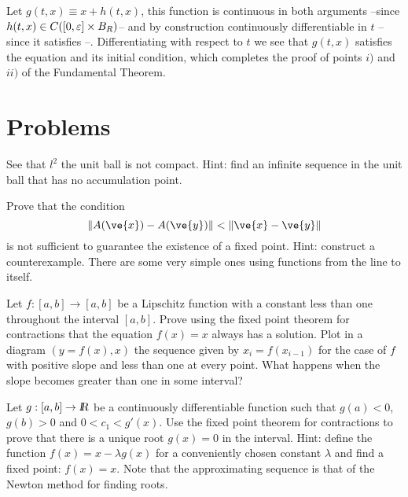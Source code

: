 \espa
Let $g(t,x)\equiv x+h(t,x)$, this function is continuous in both
arguments --since $h(t,x)\in C([0,\mbox{$\varepsilon$}]\times B_R)$-- and by
construction continuously
differentiable in $t$ --since it satisfies --.
Differentiating  with respect to $t$ we see that $g(t,x)$
satisfies the equation  and its initial condition, which
completes the proof of points $i)$ and $ii)$ of the Fundamental Theorem.
\epru


\section{Problems}



\bpro
See that $l^2$ the unit ball is not compact. 
Hint: find an infinite sequence in the unit ball that has no accumulation point.
\epro

\bpro
Prove that the condition 
\begin{equation}
  \|A(\ve{x}) - A(\ve{y})\| < \|\ve{x} - \ve{y}\|
\end{equation}
is not sufficient to guarantee the existence of a fixed point.
Hint: construct a counterexample. 
There are some very simple ones using functions from the line to itself.
\epro

\bpro 
Let $f:[a,b] \to [a,b]$ be a Lipschitz function with a constant less
than one throughout the interval $[a,b]$. Prove using the fixed point theorem
for contractions that the equation $f(x) = x$ always has a
solution. Plot in a diagram $(y=f(x), x)$ the sequence given by
$x_i = f(x_{i-1})$ for the case of $f$ with positive slope and less than
one at every point. What happens when the slope becomes greater than one
in some interval?
\epro

\bpro
Let $g:[a,b] \to \mbox{\sl {l$\!\!\!\;\:\!$R}}$ be a continuously differentiable function such that
$g(a) < 0$, $g(b) > 0$ and $0 < c_1 < g'(x)$. Use the fixed point theorem 
for contractions to prove that there is a unique root $g(x) = 0$ in 
the interval. Hint: define the function $f(x)= x - \lambda g(x)$ for a 
conveniently chosen constant $\lambda$ and find a fixed point: 
$f(x)=x$. Note that the approximating sequence is that of the Newton method
for finding roots.
\epro


